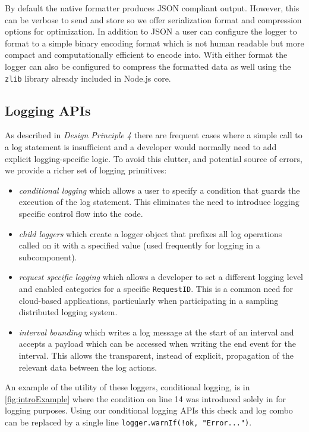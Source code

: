 By default the native formatter produces JSON compliant output. However, this 
can be verbose to send and store so we offer serialization format and compression 
options for optimization. In addition to JSON a user can configure the logger 
to format to a simple binary encoding format which is not human readable but 
more compact and computationally efficient to 
encode into. With either format the logger can also be configured to compress the 
formatted data as well using the \texttt{zlib} library already included in 
Node.js core.

\subsection{Logging APIs}
As described in \emph{Design Principle 4} there are frequent cases where a 
simple call to a log statement is insufficient and a developer would normally 
need to add explicit logging-specific logic. To avoid this clutter, and potential 
source of errors, we provide a richer set of logging primitives:
\begin{itemize}
  \item \emph{conditional logging} which allows a user to specify a condition 
  that guards the execution of the log statement. This eliminates the need to 
  introduce logging specific control flow into the code.
  \item \emph{child loggers} which create a logger object that prefixes all log 
  operations called on it with a specified value (used frequently for logging in a 
  subcomponent).
  \item \emph{request specific logging} which allows a developer to set a different 
  logging level and enabled categories for a specific \texttt{RequestID}. This is a 
  common need for cloud-based applications, particularly when participating in a 
  sampling distributed logging system.
  \item \emph{interval bounding} which writes a log message at the start of an interval 
  and accepts a payload which can be accessed when writing the end event for the interval. 
  This allows the transparent, instead of explicit, propagation of the relevant data between 
  the log actions.
\end{itemize}

An example of the utility of these loggers, conditional logging, is in
\autoref{fig:introExample} where the condition on line 14 was introduced 
solely in for logging purposes. Using our conditional logging APIs this check 
and log combo can be replaced by a single line \lstinline{logger.warnIf(!ok, "Error...")}.

